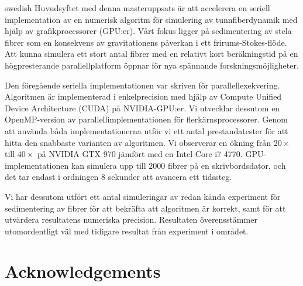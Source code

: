 \documentclass[a4paper,11pt]{kth-mag}
\begin{document}
\begin{foreignabstract}{swedish}
Huvudsyftet med denna masteruppsats är att accelerera en seriell implementation av en numerisk algoritm för simulering av tunnfiberdynamik med hjälp av grafikprocessorer (GPU:er). Vårt fokus ligger på sedimentering av stela fibrer som en konsekvens av gravitationens påverkan i ett frirums-Stokes-flöde. Att kunna simulera ett stort antal fibrer med en relativt kort beräkningstid på en högpresterande parallellplatform öppnar för nya spännande forskningsmöjligheter. 

Den föregående seriella implementationen var skriven för parallellexekvering. Algoritmen är implementerad i enkelprecision med hjälp av Compute Unified Device Architecture (CUDA) på NVIDIA-GPU:er. Vi utvecklar dessutom en OpenMP-version av parallellimplementationen för flerkärnsprocessorer. Genom att använda båda implementationerna utför vi ett antal prestandatester för att hitta den snabbaste varianten av algoritmen. Vi observerar en ökning från $20×$ till $40×$ på NVIDIA GTX 970 jämfört med en Intel Core i7 4770. GPU-implementationen kan simulera upp till $2000$ fibrer på en skrivbordsdator, och det tar endast i ordningen $8$ sekunder att avancera ett tidssteg. 

Vi har dessutom utfört ett antal simuleringar av redan kända experiment för sedimentering av fibrer för att bekräfta att algoritmen är korrekt, samt för att utvärdera resultatens numeriska precision. Resultaten överensstämmer utomordentligt väl med tidigare resultat från experiment i området. 
\end{foreignabstract}
\clearpage

\section*{Acknowledgements}
\clearpage

\tableofcontents*
\clearpage

\listoffigures
\clearpage

\listoftables
\clearpage

\listoflistings
\clearpage

\mainmatter
\pagestyle{newchap}

















\printbibliography
\clearpage

\appendix
\addappheadtotoc

\end{document}
